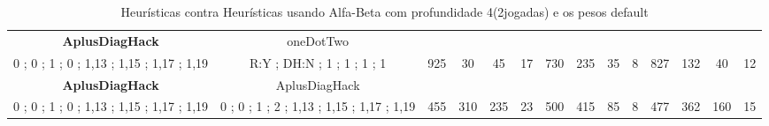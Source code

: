 \begin{table}[H]
{\begin{tabular}{|c|c|c|c|c|c|c|c|c|c|c|c|c|c|}
\cellcolor{blue!15}\textbf{AplusDiagHack} & oneDotTwo& {\color[HTML]{00009B} } & {\color[HTML]{9A0000} } & {\color[HTML]{009901} } &  & {\color[HTML]{00009B} } & {\color[HTML]{9A0000} } & {\color[HTML]{009901} } &  & {\color[HTML]{00009B} } & {\color[HTML]{9A0000} } & {\color[HTML]{009901} } &  \\ 
\cellcolor{ blue!15}0 ; 0 ; 1 ; 0 ; 1,13 ; 1,15 ; 1,17 ; 1,19 & R:Y ; DH:N ; 1 ; 1 ; 1 ; 1 & \multirow{-2}{*}{{\color[HTML]{00009B} 925}} & \multirow{-2}{*}{{\color[HTML]{9A0000} 30}} & \multirow{-2}{*}{{\color[HTML]{009901} 45}} & \multirow{-2}{*}{17} & \multirow{-2}{*}{{\color[HTML]{00009B} 730}} & \multirow{-2}{*}{{\color[HTML]{9A0000} 235}} & \multirow{-2}{*}{{\color[HTML]{009901} 35}} & \multirow{-2}{*}{8} & \multirow{-2}{*}{{\color[HTML]{00009B} 827}} & \multirow{-2}{*}{{\color[HTML]{9A0000} 132}} & \multirow{-2}{*}{{\color[HTML]{009901} 40}} & \multirow{-2}{*}{12} \\ \hline

\cellcolor{blue!15}\textbf{AplusDiagHack} & AplusDiagHack& {\color[HTML]{00009B} } & {\color[HTML]{9A0000} } & {\color[HTML]{009901} } &  & {\color[HTML]{00009B} } & {\color[HTML]{9A0000} } & {\color[HTML]{009901} } &  & {\color[HTML]{00009B} } & {\color[HTML]{9A0000} } & {\color[HTML]{009901} } &  \\ 
\cellcolor{ blue!15}0 ; 0 ; 1 ; 0 ; 1,13 ; 1,15 ; 1,17 ; 1,19 & 0 ; 0 ; 1 ; 2 ; 1,13 ; 1,15 ; 1,17 ; 1,19 & \multirow{-2}{*}{{\color[HTML]{00009B} 455}} & \multirow{-2}{*}{{\color[HTML]{9A0000} 310}} & \multirow{-2}{*}{{\color[HTML]{009901} 235}} & \multirow{-2}{*}{23} & \multirow{-2}{*}{{\color[HTML]{00009B} 500}} & \multirow{-2}{*}{{\color[HTML]{9A0000} 415}} & \multirow{-2}{*}{{\color[HTML]{009901} 85}} & \multirow{-2}{*}{8} & \multirow{-2}{*}{{\color[HTML]{00009B} 477}} & \multirow{-2}{*}{{\color[HTML]{9A0000} 362}} & \multirow{-2}{*}{{\color[HTML]{009901} 160}} & \multirow{-2}{*}{15} \\ \hline
\end{tabular}} \caption{Heurísticas contra Heurísticas usando Alfa-Beta com profundidade 4(2jogadas) e os pesos default} \label{HvsH} \end{table}
